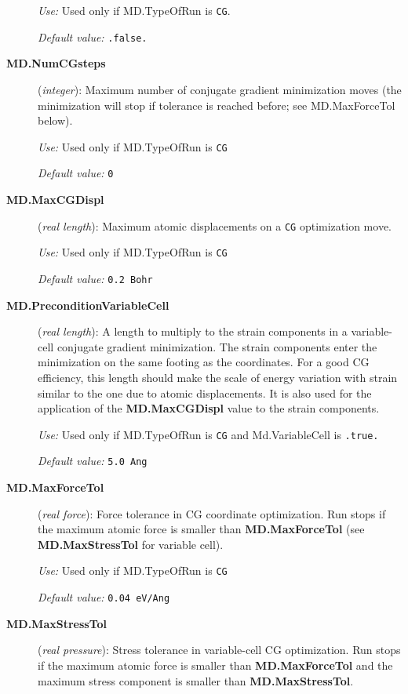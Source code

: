 \documentclass[11pt]{article}
\begin{document}
\begin{description}
{\it Use:} Used only if MD.TypeOfRun is {\tt CG}. 

{\it Default value:} {\tt .false.}


\item[{\bf MD.NumCGsteps}] ({\it integer}): 
Maximum number of conjugate gradient minimization
moves (the minimization will stop
if tolerance is reached before; see MD.MaxForceTol below).

{\it Use:} Used only if MD.TypeOfRun is {\tt CG}
    
{\it Default value:} {\tt 0}

\item[{\bf MD.MaxCGDispl}] ({\it real length}): 
Maximum atomic displacements on a {\tt CG} optimization move.

{\it Use:} Used only if MD.TypeOfRun is {\tt CG}
    
{\it Default value:} {\tt 0.2 Bohr}


\item[{\bf MD.PreconditionVariableCell}] ({\it real length}):
A length to multiply to the strain components in a variable-cell conjugate
gradient minimization. The strain components enter the minimization
on the same footing as the coordinates. For a good CG efficiency, 
this length should make
the scale of energy variation with strain similar to the one 
due to atomic displacements. It is also
used for the application of the {\bf MD.MaxCGDispl} value to
the strain components.
 
{\it Use:} Used only if MD.TypeOfRun is {\tt CG} and Md.VariableCell
is {\tt .true.}
   
{\it Default value:} {\tt 5.0 Ang}
 
 
\item[{\bf MD.MaxForceTol}] ({\it real force}): 
Force tolerance in CG coordinate optimization.  
Run stops if the maximum atomic force is
smaller than {\bf MD.MaxForceTol} (see {\bf MD.MaxStressTol}
for variable cell).

{\it Use:} Used only if MD.TypeOfRun is {\tt CG}
    
{\it Default value:} {\tt 0.04 eV/Ang}


\item[{\bf MD.MaxStressTol}] ({\it real pressure}):
Stress tolerance in variable-cell CG optimization. Run stops
if the maximum atomic force is smaller than {\bf MD.MaxForceTol}
and the maximum stress component is smaller than {\bf MD.MaxStressTol}.


\end{description}
\end{document}
